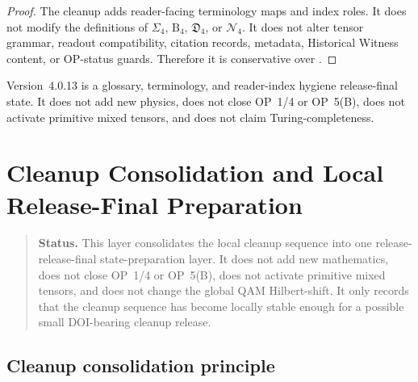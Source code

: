 \begin{proof}
The cleanup adds reader-facing terminology maps and index roles. It does not
modify the definitions of $\Sigma_4$, $\mathrm B_4$, $\mathfrak D_4$, or
$\mathcal N_4$. It does not alter tensor grammar, readout compatibility,
citation records, metadata, Historical Witness content, or OP-status guards.
Therefore it is conservative over .
\end{proof}

\begin{remark}
\label{rem:v409-non-claim}
Version~4.0.13 is a glossary, terminology, and reader-index hygiene release-final state.
It does not add new physics, does not close OP~1/4 or OP~5(B), does not
activate primitive mixed tensors, and does not claim Turing-completeness.
\end{remark}



\clearpage
\section{ Cleanup Consolidation and Local Release-Final Preparation}
\label{sec:v4010-cleanup-consolidation-local-release-release-final state-preparation}

\begin{quote}\small
\noindent\textbf{Status.}
This  layer consolidates the local cleanup sequence into one
release-release-final state-preparation layer. It does not add new mathematics, does not
close OP~1/4 or OP~5(B), does not activate primitive mixed tensors, and does
not change the  global QAM Hilbert-shift. It only records that the
cleanup sequence has become locally stable enough for a possible small
DOI-bearing cleanup release.
\end{quote}

\subsection{Cleanup consolidation principle}
\label{subsec:v4010-cleanup-consolidation-principle}

